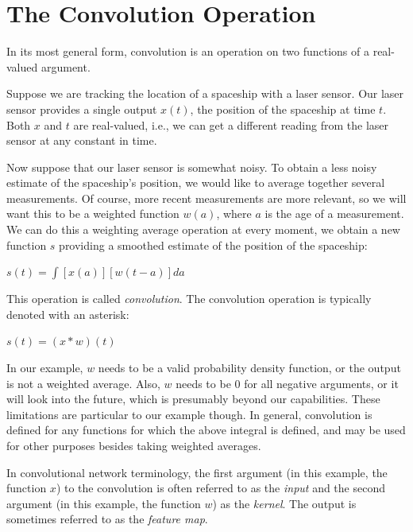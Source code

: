 \documentclass{report}
\begin{document}
\section{The Convolution Operation}
In its most general form, convolution is an operation on two functions of a real-valued argument.\newline

\noindent Suppose we are tracking the location of a spaceship with a laser sensor. Our laser sensor provides a single output $x(t)$, the position of the spaceship at time $t$. Both $x$ and $t$ are real-valued, i.e., we can get a different reading from the laser sensor at any constant in time.\newline

\noindent Now suppose that our laser sensor is somewhat noisy. To obtain a less noisy estimate of the spaceship's position, we would like to average together several measurements. Of course, more recent measurements are more relevant, so we will want this to be a weighted function $w(a)$, where $a$ is the age of a measurement. We can do this a weighting average operation at every moment, we obtain a new function $s$ providing a smoothed estimate of the position of the spaceship:\newline\newline
    \centerline{$s(t) = \int [x(a)][w(t-a)]da$}\newline\newline
\noindent This operation is called \textit{convolution}. The convolution operation is typically denoted with an asterisk:\newline
    \centerline{$s(t) = (x * w)(t)$}\newline

In our example, $w$ needs to be a valid probability density function, or the output is not a weighted average. Also, $w$ needs to be 0 for all negative arguments, or it will look into the future, which is presumably beyond our capabilities. These limitations are particular to our example though. In general, convolution is defined for any functions for which the above integral is defined, and may be used for other purposes besides taking weighted averages.\newline

\noindent In convolutional network terminology, the first argument (in this example, the function $x$) to the convolution is often referred to as the \textit{input} and the second argument (in this example, the function $w$) as the \textit{kernel}. The output is sometimes referred to as the \textit{feature map}.\newline
\end{document}
